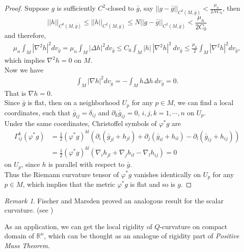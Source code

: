 \documentclass[12pt]{amsart}
\theoremstyle{definition}
\theoremstyle{remark}
\newtheorem{remark}[theorem]{Remark}
\numberwithin{equation}{section}
\begin{document}
\begin{proof}
Suppose $g$ is sufficiently $C^2$-closed to $\bar g$, say $||g-\bar{g}||_{C^2(M,\bar{g})} < \frac{\mu_n}{2NC_0}$, then $$||h||_{C^0(M,\bar{g})} \leq ||h||_{C^2(M,\bar{g})} \leq N ||g-\bar{g}||_{C^2(M,\bar{g})} < \frac{\mu_n}{2C_0}$$ and therefore,
\begin{align*}
\mu_n\int_M |\nabla^2 h|^2dv_{\bar{g}} = \mu_n\int_M |\Delta h|^2dv_{\bar{g}} \leq C_0 \int_M |h|\ |\nabla^2{h}|^2 \ dv_{\bar{g}} \leq \frac{\mu_n}{2}\int_M |\nabla^2 h|^2dv_{\bar{g}},
\end{align*}
which implies $\nabla^2 h = 0$ on $M$. \\

Now we have
\begin{align*}
\int_M |\nabla h |^2 dv_{\bar{g}} = - \int_M h \Delta h\  dv_{\bar{g}} = 0.
\end{align*}
That is $\nabla h = 0$.\\

Since $\bar{g}$ is flat, then on a neighborhood $U_p$ for any $ p \in M$, we can find a local coordinates, such that $\bar{g}_{ij} = \delta_{ij}$ and $\partial_k \bar{g}_{ij} = 0$, $i,j,k = 1, \cdots, n$ on $U_p$.\\

Under the same coordinates, Christoffel symbols of $\varphi^*g$ are
\begin{align*}
\Gamma^k_{ij}(\varphi^*g) &= \frac{1}{2} (\varphi^*g)^{kl} \left(\partial_i (\bar{g}_{jl} + h_{jl}) + \partial_j (\bar{g}_{il} + h_{il}) - \partial_l (\bar{g}_{ij} + h_{ij}) \right) \\
&= \frac{1}{2} (\varphi^*g)^{kl} (\nabla_i  h_{jl} + \nabla_j h_{il} - \nabla_l h_{ij}) = 0
\end{align*}
on $U_p$, since $h$ is parallel with respect to $\bar{g}$. \\

Thus the Riemann curvature tensor of $\varphi^* g$ vanishes identically on $U_p$ for any $p \in M$, which implies that the metric $\varphi^*g$ is flat and so is $g$.
\end{proof}

\begin{remark}
Fischer and Marsden proved an analogous result for the scalar curvature. (see \cite{F-M}) 
\end{remark}

As an application, we can get the local rigidity of $Q$-curvature on compact domain of $\mathbb{R}^n$, which can be thought as an analogue of rigidity  part of \emph{Positive Mass Theorem}.
\end{document}
